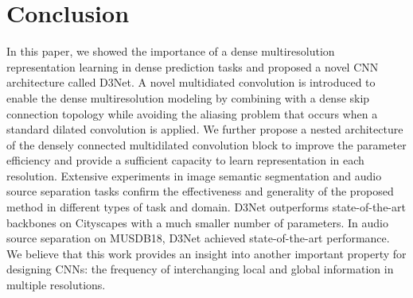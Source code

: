 \documentclass[final]{cvpr}
\begin{document}
\section{Conclusion}
In this paper, we showed the importance of a dense multiresolution representation learning in dense prediction tasks and proposed a novel CNN architecture called D3Net. A novel multidiated convolution is introduced to enable the dense multiresolution modeling by combining with a dense skip connection topology while avoiding the aliasing problem that occurs when a standard dilated convolution is applied. We further propose a nested architecture of the densely connected multidilated convolution block to improve the parameter efficiency and provide a sufficient capacity to learn representation in each resolution. 
Extensive experiments in image semantic segmentation and audio source separation tasks confirm the effectiveness and generality of the proposed method in different types of task and domain.
D3Net outperforms state-of-the-art backbones on Cityscapes with a much smaller number of parameters. In audio source separation on MUSDB18, D3Net achieved state-of-the-art performance. 
We believe that this work provides an insight into another important property for designing CNNs: the frequency of interchanging local and global information in multiple resolutions.   
\end{document}
